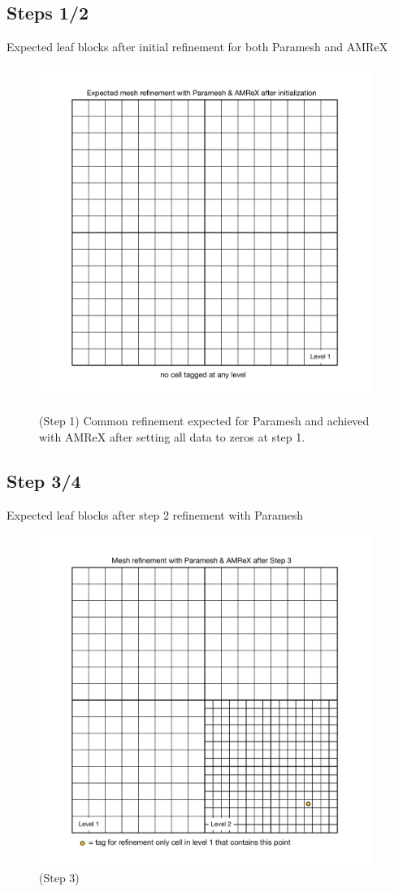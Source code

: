 \documentclass[12pt,letterpaper]{article}
\begin{document}
\subsection{Steps 1/2}
Expected leaf blocks after initial refinement for both Paramesh and AMReX
\begin{figure}[!hp]
\begin{center}
\includegraphics[width=4.25in]{TestRefine_Step2_Both.pdf}\\
\caption{(Step 1) Common refinement expected for Paramesh and achieved with AMReX after
setting all data to zeros at step 1.}
\end{center}
\end{figure}

\newpage
\subsection{Step 3/4}
Expected leaf blocks after step 2 refinement with Paramesh
\begin{figure}[!hp]
\begin{center}
\includegraphics[width=4.25in]{TestRefine_Step4_Both.pdf}
\caption{(Step 3) }
\end{center}
\end{figure}
\end{document}
